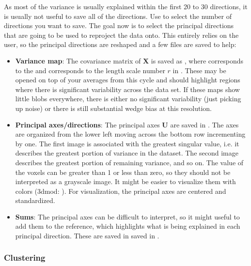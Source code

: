 As most of the variance is usually explained within the first 20 to 30 directions, it is usually not useful to save all of the directions. Use  to select the number of directions you want to save. The goal now is to select the principal directions that are going to be used to reproject the data onto. This entirely relies on the user, so the principal directions are reshaped and a few files are saved to help:
\begin{itemize}
    \item \textbf{Variance map}: The covariance matrix of $\bm{X}$ is saved as , where  corresponds to the  and  corresponds to the length scale number $r$ in . These may be opened on top of your averages from this cycle and should highlight regions where there is significant variability across the data set. If these maps show little blobs everywhere, there is either no significant variability (just picking up noise) or there is still substantial wedge bias at this resolution.
    
    \item \textbf{Principal axes/directions}: The principal axes $\bm{U}$ are saved in . The axes are organized from the lower left moving across the bottom row incrementing by one. The first image is associated with the greatest singular value, i.e. it describes the greatest portion of variance in the dataset. The second image describes the greatest portion of remaining variance, and so on. The value of the voxels can be greater than 1 or less than zero, so they should not be interpreted as a grayscale image. It might be easier to visualize them with colors (3dmod: ). For visualization, the principal axes are centered and standardized.
    
    \item \textbf{Sums}: The principal axes can be difficult to interpret, so it might useful to add them to the reference, which highlights what is being explained in each principal direction. These are saved in saved in .
\end{itemize}

\subsubsection{Clustering}


